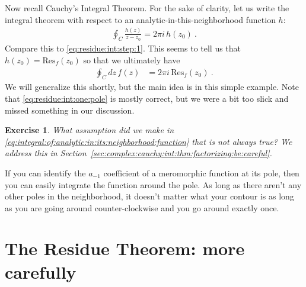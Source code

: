 \documentclass[
  11pt,
	colorful,
	raggedright,
]{tufte-style-thesis-flip}
\newtheorem{exercise}{Exercise}[section]
\begin{document}
Now recall Cauchy's Integral Theorem. For the sake of clarity, let us write the integral theorem with respect to an analytic-in-this-neighborhood function $h$:
\begin{align}
  \oint_C \frac{h(z)}{z-z_0} = {2\pi i} \, h(z_0) \ .
  \label{eq:integral:of:analytic:in:its:neighborhood:function}
\end{align}
Compare this to \eqref{eq:residue:int:step:1}. This seems to tell us that $h(z_0) = \text{Res}_f(z_0)$ so that we ultimately have
\begin{align}
  \oint_C dz\, f(z) &=  2\pi i  \, \text{Res}_f(z_0) \ .
  \label{eq:residue:int:one:pole}
\end{align}
We will generalize this shortly, but the main idea is in this simple example. Note that \eqref{eq:residue:int:one:pole} is mostly correct, but we were a bit too slick and missed something in our discussion.
\begin{exercise}
What assumption did we make in \eqref{eq:integral:of:analytic:in:its:neighborhood:function} that is not always true? We address this in Section~\ref{sec:complex:cauchy:int:thm:factorizing:be:careful}.
\end{exercise}
If you can identify the $a_{-1}$ coefficient of a meromorphic function at its pole, then you can easily integrate the function around the pole. As long as there aren't any other poles in the neighborhood, it doesn't matter what your contour is as long as you are going around counter-clockwise and you go around exactly once.


\section{The Residue Theorem: more carefully}
\end{document}
